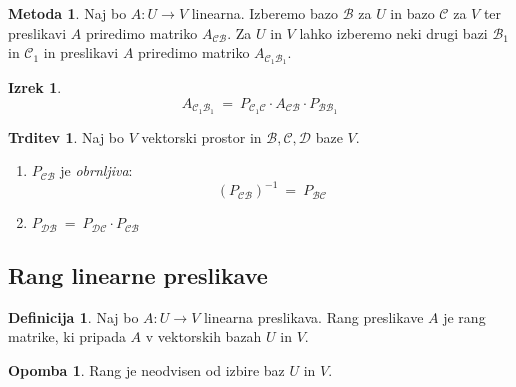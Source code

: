 \documentclass[11pt]{article}
\newcommand{\0}{\mathbf{0}}
\newcommand{\B}{\mathscr{B}}
\newcommand{\C}{\mathscr{C}}
\newcommand{\D}{\mathscr{D}}
\theoremstyle{definition}
\newtheorem{definicija}{Definicija}[section]
\theoremstyle{definition}
\newtheorem{trditev}{Trditev}[section]
\theoremstyle{definition}
\newtheorem{izrek}{Izrek}[section]
\theoremstyle{definition}
\newtheorem{metoda}{Metoda}[section]
\newtheorem*{opomba}{Opomba}
\begin{document}
\begin{metoda}

Naj bo $A: U \rightarrow V$ linearna. Izberemo bazo $\B$ za $U$ in bazo $\C$ za $V$ ter preslikavi $A$ priredimo matriko $A_{\C\B}$. Za $U$ in $V$ lahko izberemo neki drugi bazi $\B_1$ in $\C_1$ in preslikavi $A$ priredimo matriko $A_{\C_1\B_1}$.

\end{metoda}
\vspace{0.5cm}

\begin{izrek}

$$A_{\C_1 \B_1} ~=~ P_{\C_1 \C} \cdot A_{\C\B} \cdot P_{\B\B_1}$$

\end{izrek}
\vspace{0.5cm}

\begin{trditev}

Naj bo $V$ vektorski prostor in $\B,\C,\D$ baze $V$.
\begin{enumerate}
	\item $P_{\C\B}$ je \textit{obrnljiva}:
	$$\left(P_{\C\B}\right)^{-1} ~=~ P_{\B\C}$$
	\item $P_{\D\B} ~=~ P_{\D\C} \cdot P_{\C\B}$
\end{enumerate} 

\end{trditev}
\vspace{0.5cm}


\subsection{Rang linearne preslikave}
\vspace{0.5cm}

\begin{definicija}

Naj bo $A: U \rightarrow V$ linearna preslikava. Rang preslikave $A$ je rang matrike, ki pripada $A$ v vektorskih bazah $U$ in $V$.

\end{definicija}
\vspace{0.5cm}

\begin{opomba}

Rang je neodvisen od izbire baz $U$ in $V$.

\end{opomba}
\vspace{0.5cm}
\end{document}
